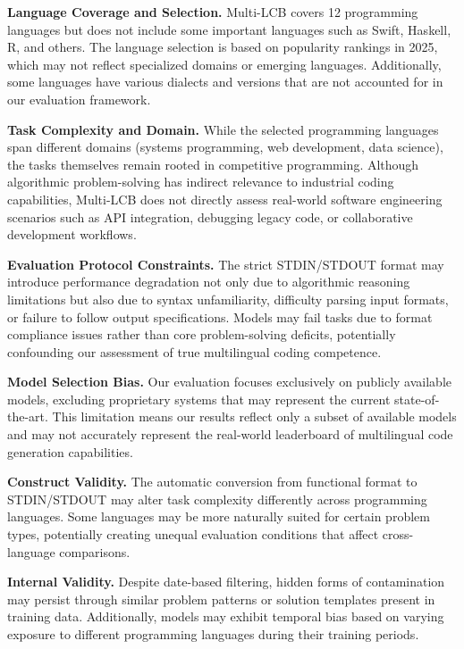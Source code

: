 \documentclass{article} %
\begin{document}
\textbf{Language Coverage and Selection.} 
Multi-LCB covers 12 programming languages but does not include some important languages such as Swift, Haskell, R, and others. The language selection is based on popularity rankings in 2025, which may not reflect specialized domains or emerging languages. Additionally, some languages have various dialects and versions that are not accounted for in our evaluation framework.

\textbf{Task Complexity and Domain.} 
While the selected programming languages span different domains (systems programming, web development, data science), the tasks themselves remain rooted in competitive programming. Although algorithmic problem-solving has indirect relevance to industrial coding capabilities, Multi-LCB does not directly assess real-world software engineering scenarios such as API integration, debugging legacy code, or collaborative development workflows.

\textbf{Evaluation Protocol Constraints.} 
The strict STDIN/STDOUT format may introduce performance degradation not only due to algorithmic reasoning limitations but also due to syntax unfamiliarity, difficulty parsing input formats, or failure to follow output specifications. Models may fail tasks due to format compliance issues rather than core problem-solving deficits, potentially confounding our assessment of true multilingual coding competence.

\textbf{Model Selection Bias.} 
Our evaluation focuses exclusively on publicly available models, excluding proprietary systems that may represent the current state-of-the-art. This limitation means our results reflect only a subset of available models and may not accurately represent the real-world leaderboard of multilingual code generation capabilities.


\textbf{Construct Validity.} 
The automatic conversion from functional format to STDIN/STDOUT may alter task complexity differently across programming languages. Some languages may be more naturally suited for certain problem types, potentially creating unequal evaluation conditions that affect cross-language comparisons.

\textbf{Internal Validity.} 
Despite date-based filtering, hidden forms of contamination may persist through similar problem patterns or solution templates present in training data. Additionally, models may exhibit temporal bias based on varying exposure to different programming languages during their training periods.
\end{document}
